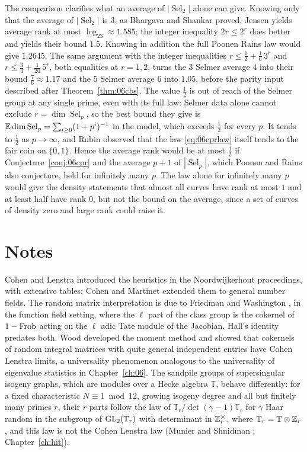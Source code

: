 The comparison clarifies what an average of $|\operatorname{Sel}_2|$ alone can give. Knowing only that the average of $|\operatorname{Sel}_2|$ is $3$, as Bhargava and Shankar proved, Jensen yields average rank at most $\log_23\approx1.585$; the integer inequality $2r\le2^r$ does better and yields their bound $1.5$. Knowing in addition the full Poonen Rains law would give $1.2645$. The same argument with the integer inequalities $r\le\frac12+\frac16\,3^r$ and $r\le\frac34+\frac1{20}\,5^r$, both equalities at $r = 1,2$, turns the $3$ Selmer average $4$ into their bound $\frac76\approx1.17$ and the $5$ Selmer average $6$ into $1.05$, before the parity input described after Theorem~\ref{thm:06cbs}. The value $\frac12$ is out of reach of the Selmer group at any single prime, even with its full law: Selmer data alone cannot exclude $r = \dim\operatorname{Sel}_p$, so the best bound they give is $\mathbb{E}\dim\operatorname{Sel}_p = \sum_{i\ge0}(1+p^i)^{-1}$ in the model, which exceeds $\frac12$ for every $p$. It tends to $\frac12$ as $p\to\infty$, and Rubin observed \cite{poonenrains2012} that the law \eqref{eq:06cprlaw} itself tends to the fair coin on $\{0,1\}$. Hence the average rank would be at most $\frac12$ if Conjecture~\ref{conj:06cpr} and the average $p+1$ of $|\operatorname{Sel}_p|$, which Poonen and Rains also conjecture, held for infinitely many $p$. The law alone for infinitely many $p$ would give the density statements that almost all curves have rank at most $1$ and at least half have rank $0$, but not the bound on the average, since a set of curves of density zero and large rank could raise it.

\section{Notes}

Cohen and Lenstra \cite{cohenlenstra1984} introduced the heuristics in the Noordwijkerhout proceedings, with extensive tables; Cohen and Martinet \cite{cohenmartinet1990} extended them to general number fields. The random matrix interpretation is due to Friedman and Washington \cite{friedmanwashington1989}, in the function field setting, where the $\ell$ part of the class group is the cokernel of $1-\operatorname{Frob}$ acting on the $\ell$ adic Tate module of the Jacobian. Hall's identity \cite{hall1938} predates both. Wood developed the moment method \cite{wood2017} and showed \cite{wood2019} that cokernels of random integral matrices with quite general independent entries have Cohen Lenstra limits, a universality phenomenon analogous to the universality of eigenvalue statistics in Chapter~\ref{ch:06}. The sandpile groups of supersingular isogeny graphs, which are modules over a Hecke algebra $\mathbb T$, behave differently: for a fixed characteristic $N\equiv1\bmod12$, growing isogeny degree and all but finitely many primes $r$, their $r$ parts follow the law of $\mathbb T_r/\det(\gamma-1)\mathbb T_r$ for $\gamma$ Haar random in the subgroup of $\mathrm{GL}_2(\mathbb T_r)$ with determinant in $\mathbb{Z}_r^\times$, where $\mathbb T_r=\mathbb T\otimes\mathbb{Z}_r$, and this law is not the Cohen Lenstra law (Munier and Shnidman \cite{muniershnidman2023}; Chapter~\ref{ch:hit}).

